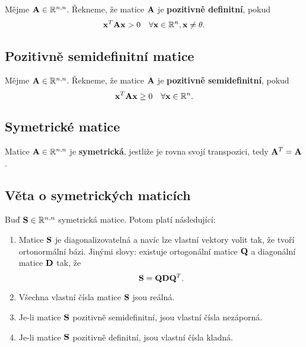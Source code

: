 Mějme $\mathbf{A} \in \mathbb{R}^{n,n}$.
Řekneme, že matice $\mathbf{A}$ je \textbf{pozitivně definitní}, pokud
\[ \mathbf{x}^T \mathbf{A} \mathbf{x} > 0 \quad \forall \mathbf{x} \in \mathbb{R}^{n}, \mathbf{x} \neq \theta. \]

\subsection*{Pozitivně semidefinitní matice}

Mějme $\mathbf{A} \in \mathbb{R}^{n,n}$.
Řekneme, že matice $\mathbf{A}$ je \textbf{pozitivně semidefinitní}, pokud
\[ \mathbf{x}^T \mathbf{A} \mathbf{x} \geq 0 \quad \forall \mathbf{x} \in \mathbb{R}^{n}. \]

\subsection*{Symetrické matice}

Matice $\mathbf{A} \in \mathbb{R}^{n,n}$ je \textbf{symetrická}, jestliže je rovna svojí transpozici, tedy $\mathbf{A}^T = \mathbf{A}$.

\subsection*{Věta o symetrických maticích}

Buď $\mathbf{S} \in \mathbb{R}^{n,n}$ symetrická matice. Potom platí následující:
\begin{enumerate}
	\item Matice $\mathbf{S}$ je diagonalizovatelná a navíc lze vlastní vektory volit tak, že tvoří ortonormální bázi. Jinými slovy: existuje ortogonální matice $\mathbf{Q}$ a diagonální matice $\mathbf{D}$ tak, že
	\[ \mathbf{S} = \mathbf{Q}\mathbf{D}\mathbf{Q}^T. \]
	\item Všechna vlastní čísla matice $\mathbf{S}$ jsou reálná.
	\item Je-li matice $\mathbf{S}$ pozitivně semidefinitní, jsou vlastní čísla nezáporná.
	\item Je-li matice $\mathbf{S}$ pozitivně definitní, jsou vlastní čísla kladná.
\end{enumerate}

\pagebreak